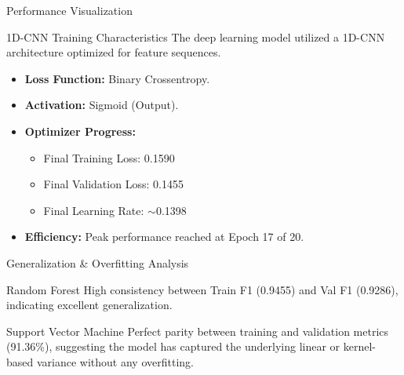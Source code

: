 \documentclass[10pt]{beamer}
\begin{document}
\begin{frame}{Performance Visualization}
    \begin{center}
    \end{center}
\end{frame}

\begin{frame}{1D-CNN Training Characteristics}
    The deep learning model utilized a 1D-CNN architecture optimized for feature sequences.
    
    \begin{itemize}
        \item \textbf{Loss Function:} Binary Crossentropy.
        \item \textbf{Activation:} Sigmoid (Output).
        \item \textbf{Optimizer Progress:} 
            \begin{itemize}
                \item Final Training Loss: 0.1590
                \item Final Validation Loss: 0.1455
                \item Final Learning Rate: $\sim$0.1398
            \end{itemize}
        \item \textbf{Efficiency:} Peak performance reached at Epoch 17 of 20.
    \end{itemize}
\end{frame}

\begin{frame}{Generalization & Overfitting Analysis}
    \begin{block}{Random Forest}
        High consistency between Train F1 (0.9455) and Val F1 (0.9286), indicating excellent generalization.
    \end{block}
    
    \begin{block}{Support Vector Machine}
        Perfect parity between training and validation metrics (91.36\%), suggesting the model has captured the underlying linear or kernel-based variance without any overfitting.
    \end{block}
\end{frame}
\end{document}
